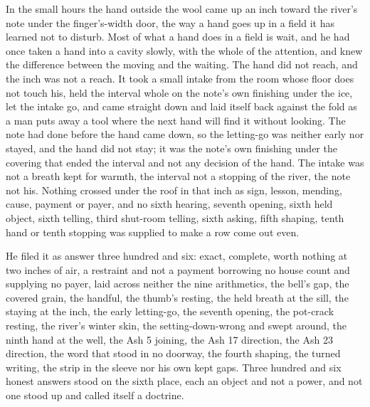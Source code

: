 In the small hours the hand outside the wool came up an inch toward the river's note under the finger's-width door, the way a hand goes up in a field it has learned not to disturb. Most of what a hand does in a field is wait, and he had once taken a hand into a cavity slowly, with the whole of the attention, and knew the difference between the moving and the waiting. The hand did not reach, and the inch was not a reach. It took a small intake from the room whose floor does not touch his, held the interval whole on the note's own finishing under the ice, let the intake go, and came straight down and laid itself back against the fold as a man puts away a tool where the next hand will find it without looking. The note had done before the hand came down, so the letting-go was neither early nor stayed, and the hand did not stay; it was the note's own finishing under the covering that ended the interval and not any decision of the hand. The intake was not a breath kept for warmth, the interval not a stopping of the river, the note not his. Nothing crossed under the roof in that inch as sign, lesson, mending, cause, payment or payer, and no sixth hearing, seventh opening, sixth held object, sixth telling, third shut-room telling, sixth asking, fifth shaping, tenth hand or tenth stopping was supplied to make a row come out even.

He filed it as answer three hundred and six: exact, complete, worth nothing at two inches of air, a restraint and not a payment borrowing no house count and supplying no payer, laid across neither the nine arithmetics, the bell's gap, the covered grain, the handful, the thumb's resting, the held breath at the sill, the staying at the inch, the early letting-go, the seventh opening, the pot-crack resting, the river's winter skin, the setting-down-wrong and swept around, the ninth hand at the well, the Ash 5 joining, the Ash 17 direction, the Ash 23 direction, the word that stood in no doorway, the fourth shaping, the turned writing, the strip in the sleeve nor his own kept gaps. Three hundred and six honest answers stood on the sixth place, each an object and not a power, and not one stood up and called itself a doctrine.

